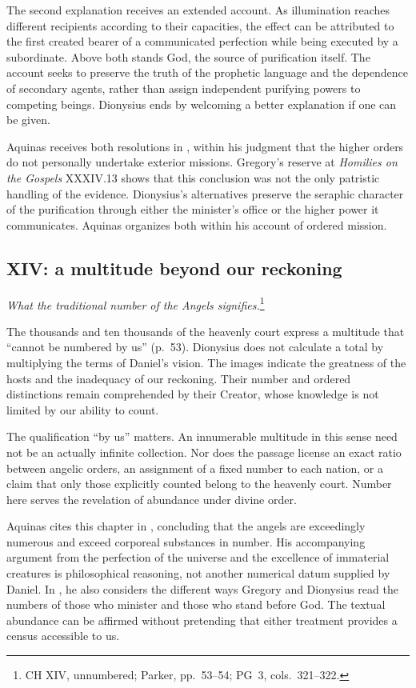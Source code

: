The second explanation receives an extended account. As illumination reaches different recipients according to their capacities, the effect can be attributed to the first created bearer of a communicated perfection while being executed by a subordinate. Above both stands God, the source of purification itself. The account seeks to preserve the truth of the prophetic language and the dependence of secondary agents, rather than assign independent purifying powers to competing beings. Dionysius ends by welcoming a better explanation if one can be given.

Aquinas receives both resolutions in , within his judgment that the higher orders do not personally undertake exterior missions. Gregory's reserve at \emph{Homilies on the Gospels} XXXIV.13 shows that this conclusion was not the only patristic handling of the evidence. Dionysius's alternatives preserve the seraphic character of the purification through either the minister's office or the higher power it communicates. Aquinas organizes both within his account of ordered mission.

\subsection{XIV: a multitude beyond our reckoning}
\emph{What the traditional number of the Angels signifies.}\footnote{CH XIV, unnumbered; Parker, pp.~53--54; PG~3, cols.~321--322.}

The thousands and ten thousands of the heavenly court express a multitude that ``cannot be numbered by us'' (p.~53). Dionysius does not calculate a total by multiplying the terms of Daniel's vision. The images indicate the greatness of the hosts and the inadequacy of our reckoning. Their number and ordered distinctions remain comprehended by their Creator, whose knowledge is not limited by our ability to count.

The qualification ``by us'' matters. An innumerable multitude in this sense need not be an actually infinite collection. Nor does the passage license an exact ratio between angelic orders, an assignment of a fixed number to each nation, or a claim that only those explicitly counted belong to the heavenly court. Number here serves the revelation of abundance under divine order.

Aquinas cites this chapter in , concluding that the angels are exceedingly numerous and exceed corporeal substances in number. His accompanying argument from the perfection of the universe and the excellence of immaterial creatures is philosophical reasoning, not another numerical datum supplied by Daniel. In , he also considers the different ways Gregory and Dionysius read the numbers of those who minister and those who stand before God. The textual abundance can be affirmed without pretending that either treatment provides a census accessible to us.

